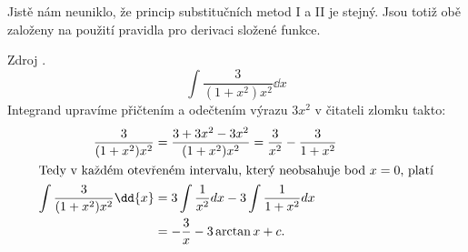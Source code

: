       

      Jistě nám neuniklo, že princip substitučních metod I a II je stejný. Jsou totiž obě založeny 
      na použití pravidla pro derivaci složené funkce.
  
      
      
      \begin{example}
        Zdroj \cite[s.~29]{Knichal}.
        \begin{equation}\label{MA:int_ex_02}
          \int\frac{3}{(1+x^2)x^2}\dd{x}
        \end{equation}
        Integrand upravíme přičtením a odečtením výrazu $3x^2$ v čitateli zlomku takto:
        \begin{align*}
          \frac{3}{(1+x^2)x^2} 
            &= \frac{3+3x^2-3x^2}{(1+x^2)x^2} = \frac{3}{x^2}-\frac{3}{1+x^2}                      \\  
          \intertext{Tedy v každém otevřeném intervalu, který neobsahuje bod \(x=0\), platí}
          \int{\frac{3}{(1+x^2)x^2}\dd{x}} 
            &= 3\int{\frac{1}{x^2}dx} - 3\int{\frac{1}{1+x^2}dx}                                   \\
            &= -\frac{3}{x}-3\arctan x + c. 
        \end{align*}
      \end{example}
      
